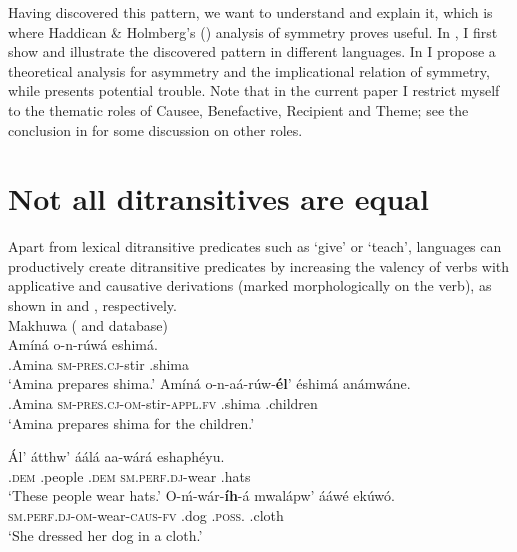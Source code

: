 \documentclass[output=paper]{LSP/langsci}
\begin{document}
Having discovered this pattern, we want to understand and explain it, which is where Haddican \& Holmberg’s (\citeyear{HaddicanHolmberg2012,HaddicanHolmberg2015}) analysis of symmetry proves useful. In , I first show and illustrate the discovered pattern in different languages. In  I propose a theoretical analysis for asymmetry and the implicational relation of symmetry, while  presents potential trouble. Note that in the current paper I restrict myself to the thematic roles of Causee, Benefactive, Recipient and Theme; see the conclusion in  for some discussion on other roles.

\section{Not all ditransitives are equal}\label{sec:vdw:2}

Apart from lexical ditransitive predicates such as ‘give’ or ‘teach’,  languages can productively create ditransitive predicates by increasing the valency of verbs with applicative and causative derivations (marked morphologically on the verb), as shown in  and , respectively.\\


\noindent Makhuwa (\citealt[71]{VanderWal2009} and database)\\
\ea\label{ex:vanderwal:4}%
\ea\label{ex:vanderwal:4a}
\gll Amíná  o-n-rúwá  eshimá.\\
    .Amina  \textsc{sm}{}-\textsc{pres.cj}{}-stir  .shima\\
    \glt ‘Amina prepares shima.’
\ex\label{ex:vanderwal:4b}
\gll Amíná  o-n-aá-rúw-\textbf{él}’  éshimá  anámwáne.\\
    .Amina  \textsc{sm}{}-\textsc{pres.cj}{}-\textsc{om}{}-stir-\textsc{appl.fv}  .shima  .children\\
    \glt ‘Amina prepares shima for the children.’
\z
\z


\ea\label{ex:vanderwal:5}%
\ea\label{ex:vanderwal:5a}
\gll Ál’  átthw’  áálá  aa-wárá  eshaphéyu.\\
    .\textsc{dem}  .people  .\textsc{dem}  \textsc{sm.perf.dj}{}-wear  .hats\\
    \glt ‘These people wear hats.’
\ex\label{ex:vanderwal:5b}
 \gll O-\'{m}-wár-\textbf{íh}{}-á  mwalápw’  ááwé  ekúwó.\\
    \textsc{sm}.\textsc{perf}.\textsc{dj}{}-\textsc{om}{}-wear-\textsc{caus-fv}  .dog  .\textsc{poss}.  .cloth \\
    \glt ‘She dressed her dog in a cloth.’
\z
\z
\end{document}
